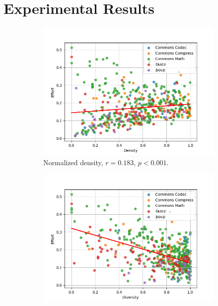 \documentclass[twoside,a4paper,11pt]{memoir}
\begin{document}
\section{Experimental Results}%
\label{sec:rq2_experimental_results}

\begin{figure}
    \centering
    \begin{subfigure}[t]{0.49\linewidth}
        \centering
        \includegraphics[width=\linewidth]{figures/effort_density}
        \caption{Normalized density, \(r = 0.183 \), \(p < 0.001 \).}%
        \label{fig:effort_density}
    \end{subfigure}
    \hfill
    \begin{subfigure}[t]{0.49\linewidth}
        \centering
        \includegraphics[width=\linewidth]{figures/effort_diversity}

\end{subfigure}
\end{figure}
\end{document}
